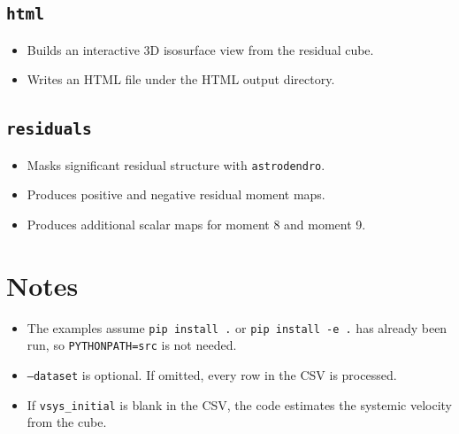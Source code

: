 \documentclass{report}
\begin{document}
\subsection{\texttt{html}}
\begin{itemize}
    \item Builds an interactive 3D isosurface view from the residual cube.
    \item Writes an HTML file under the HTML output directory.
\end{itemize}

\subsection{\texttt{residuals}}
\begin{itemize}
    \item Masks significant residual structure with \texttt{astrodendro}.
    \item Produces positive and negative residual moment maps.
    \item Produces additional scalar maps for moment 8 and moment 9.
\end{itemize}

\section{Notes}
\begin{itemize}
    \item The examples assume \texttt{pip install .} or \texttt{pip install -e .} has already been run, so \texttt{PYTHONPATH=src} is not needed.
    \item \texttt{--dataset} is optional. If omitted, every row in the CSV is processed.
    \item If \texttt{vsys\_initial} is blank in the CSV, the code estimates the systemic velocity from the cube.
\end{itemize}



\end{document}
